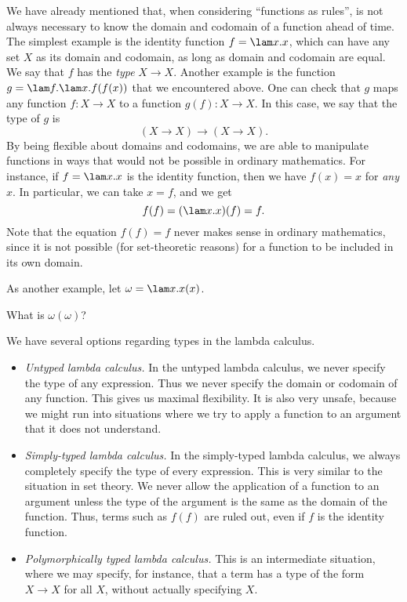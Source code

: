 \documentclass[12pt]{article}
\begin{document}
We have already mentioned that, when considering ``functions as
rules'', is not always necessary to know the domain and codomain of a
function ahead of time. The simplest example is the identity function
$f = \lam x.x$, which can have any set $X$ as its domain and codomain,
as long as domain and codomain are equal. We say that $f$ has the {\em
  type} $X\to X$.  Another example is the function $g = \lam f.\lam
x.f(f(x))$ that we encountered above. One can check that $g$ maps any
function $f:X\to X$ to a function $g(f):X\to X$. In this case, we say
that the type of $g$ is
\[          (X\to X)\to(X\to X).
\]
By being flexible about domains and codomains, we are able to
manipulate functions in ways that would not be possible in ordinary
mathematics. For instance, if $f=\lam x.x$ is the identity function,
then we have $f(x) = x$ for {\em any} $x$. In particular, we can take
$x=f$, and we get
\[     f(f) = (\lam x.x)(f) = f.
\]
Note that the equation $f(f)=f$ never makes sense in ordinary
mathematics, since it is not possible (for set-theoretic reasons) for
a function to be included in its own domain.

As another example, let $\omega = \lam x.x(x)$. 

\begin{exercise}
  What is $\omega(\omega)$?
\end{exercise}

We have several options regarding types in the lambda calculus.
\begin{itemize}
\item {\em Untyped lambda calculus.} In the untyped lambda calculus,
  we never specify the type of any expression. Thus we never specify
  the domain or codomain of any function. This gives us maximal
  flexibility. It is also very unsafe, because we might run into
  situations where we try to apply a function to an argument that it
  does not understand. 
\item {\em Simply-typed lambda calculus.} In the simply-typed lambda
  calculus, we always completely specify the type of every expression. 
  This is very similar to the situation in set theory. We never allow
  the application of a function to an argument unless the type of the
  argument is the same as the domain of the function. Thus, terms such
  as $f(f)$ are ruled out, even if $f$ is the identity function.
\item {\em Polymorphically typed lambda calculus.} This is an
  intermediate situation, where we may specify, for instance, that a
  term has a type of the form $X\to X$ for all $X$, without actually
  specifying $X$.
\end{itemize}
\end{document}

